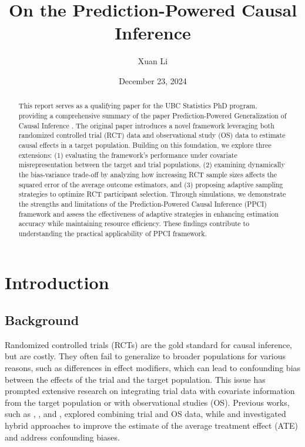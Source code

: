\documentclass[12pt, oneside]{amsart}
\title{On the Prediction-Powered Causal Inference}
\author{Xuan Li}
\date{December 23, 2024}
\theoremstyle{definition}
\theoremstyle{remark}
\numberwithin{equation}{section}
\begin{document}
\begin{abstract}
    This report serves as a qualifying paper for the UBC Statistics PhD program, providing a comprehensive summary of the paper Prediction-Powered Generalization of Causal Inference \citep{qp}. The original paper introduces a novel framework leveraging both randomized controlled trial (RCT) data and observational study (OS) data to estimate causal effects in a target population. Building on this foundation, we explore three extensions: (1) evaluating the framework's performance under covariate misrepresentation between the target and trial populations, (2) examining dynamically the bias-variance trade-off by analyzing how increasing RCT sample sizes affects the squared error of the average outcome estimators, and (3) proposing adaptive sampling strategies to optimize RCT participant selection. Through simulations, we demonstrate the strengths and limitations of the Prediction-Powered Causal Inference (PPCI) framework and assess the effectiveness of adaptive strategies in enhancing estimation accuracy while maintaining resource efficiency. These findings contribute to understanding the practical applicability of PPCI framework.
\end{abstract}
\maketitle
\tableofcontents


\section{Introduction}
\subsection{Background}
Randomized controlled trials (RCTs) are the gold standard for causal inference, but are costly. They often fail to generalize to broader populations for various reasons, such as differences in effect modifiers, which can lead to confounding bias between the effects of the trial and the target population. This issue has prompted extensive research on integrating trial data with covariate information from the target population or with observational studies (OS). Previous works, such as \citep{Dahabreh2019}, \citep{Dahabreh2020}, and \citep{Bareinboim}, explored combining trial and OS data, while \citep{guo2021} and \citep{liao2023} investigated hybrid approaches to improve the estimate of the average treatment effect (ATE) and address confounding biases. \\
\end{document}
